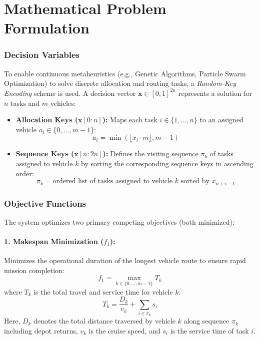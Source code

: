\section{Mathematical Problem Formulation}

\subsubsection{Decision Variables}
To enable continuous metaheuristics (e.g., Genetic Algorithms, Particle Swarm Optimization) to solve discrete allocation and routing tasks, a \textit{Random-Key Encoding} scheme is used. A decision vector $\mathbf{x} \in [0, 1]^{2n}$ represents a solution for $n$ tasks and $m$ vehicles:
\begin{itemize}
    \item \textbf{Allocation Keys ($\mathbf{x}[0:n]$):} Maps each task $i \in \{1, \dots, n\}$ to an assigned vehicle $a_i \in \{0, \dots, m-1\}$:
    \begin{equation}
        a_i = \min\left( \lfloor x_i \cdot m \rfloor, m - 1 \right)
    \end{equation}
    \item \textbf{Sequence Keys ($\mathbf{x}[n:2n]$):} Defines the visiting sequence $\pi_k$ of tasks assigned to vehicle $k$ by sorting the corresponding sequence keys in ascending order:
    \begin{equation}
        \pi_k = \text{ordered list of tasks assigned to vehicle } k \text{ sorted by } x_{n+i-1}
    \end{equation}
\end{itemize}

\subsubsection{Objective Functions}
The system optimizes two primary competing objectives (both minimized):

\paragraph{1. Makespan Minimization ($f_1$):}
Minimizes the operational duration of the longest vehicle route to ensure rapid mission completion:
\begin{equation}
    f_1 = \max_{k \in \{0, \dots, m-1\}} T_k
\end{equation}
where $T_k$ is the total travel and service time for vehicle $k$:
\begin{equation}
    T_k = \frac{D_k}{v_k} + \sum_{i \in \pi_k} s_i
\end{equation}
Here, $D_k$ denotes the total distance traversed by vehicle $k$ along sequence $\pi_k$ including depot returns, $v_k$ is the cruise speed, and $s_i$ is the service time of task $i$.

